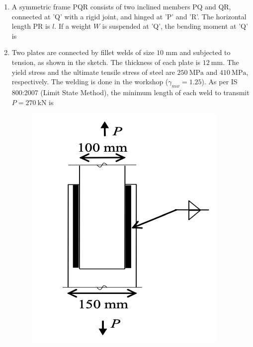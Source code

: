 \documentclass[journal]{IEEEtran}
\begin{document}
\begin{enumerate}
\item A symmetric frame PQR consists of two inclined members PQ and QR, connected at 'Q' with a rigid joint, and hinged at 'P' and 'R'. The horizontal length PR is $l$. If a weight $W$ is suspended at 'Q', the bending moment at 'Q' is \hfill {}
\begin{enumerate}
\end{enumerate}

\item Two plates are connected by fillet welds of size $10$ mm and subjected to tension, as shown in the sketch. The thickness of each plate is $12\ \text{mm}$. The yield stress and the ultimate tensile stress of steel are $250\ \text{MPa}$ and $410\ \text{MPa}$, respectively. The welding is done in the workshop ($\gamma_{mw}=1.25$). As per IS 800:2007 (Limit State Method), the minimum length  of each weld to transmit $P=270\ \text{kN}$ is \hfill {}

\begin{figure}[H]
    \centering
    \includegraphics[width=0.3\columnwidth]{figs/Q35.png} 
    \caption{}
    \label{fig:placeholder}
\end{figure}
\begin{enumerate}
\end{enumerate}


\end{enumerate}
\end{document}
